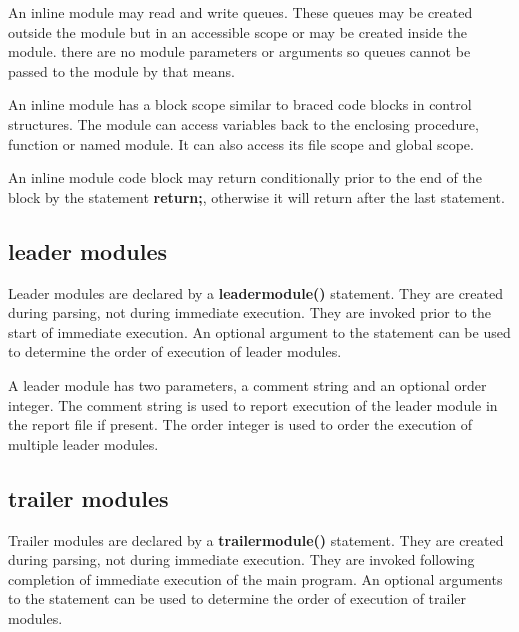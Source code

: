             An inline module may read and write queues. These queues may be created
            outside the module but in an accessible scope or may be created inside
            the module. there are no module parameters or arguments so queues cannot
            be passed to the module by that means.
 
            An inline module has a block scope similar to braced code blocks in
            control structures. The module can access variables back to the
            enclosing procedure, function or named module. It can also access
            its file scope and global scope.
        
            An inline module code block may return conditionally prior to the end
            of the block by the statement {\bf return;}, otherwise it will return
            after the last statement.



        \subsection{leader modules}

            Leader modules are declared by a {\bf leadermodule()} statement.
            They are created during parsing, not during immediate execution.
            They are invoked prior to the start of immediate execution. An
            optional argument to the statement can be used to determine the
            order of execution of leader modules.
            
            A leader module has two parameters, a comment string and an optional
            order integer. The comment string is used to report execution of the
            leader module in the report file if present. The order integer is
            used to order the execution of multiple leader modules.

        \subsection{trailer modules}

            Trailer modules are declared by a {\bf trailermodule()} statement.
            They are created during parsing, not during immediate execution.
            They are invoked following completion of immediate execution of
            the main program. An optional arguments to the statement can be
            used to determine the order of execution of trailer modules.           
            
